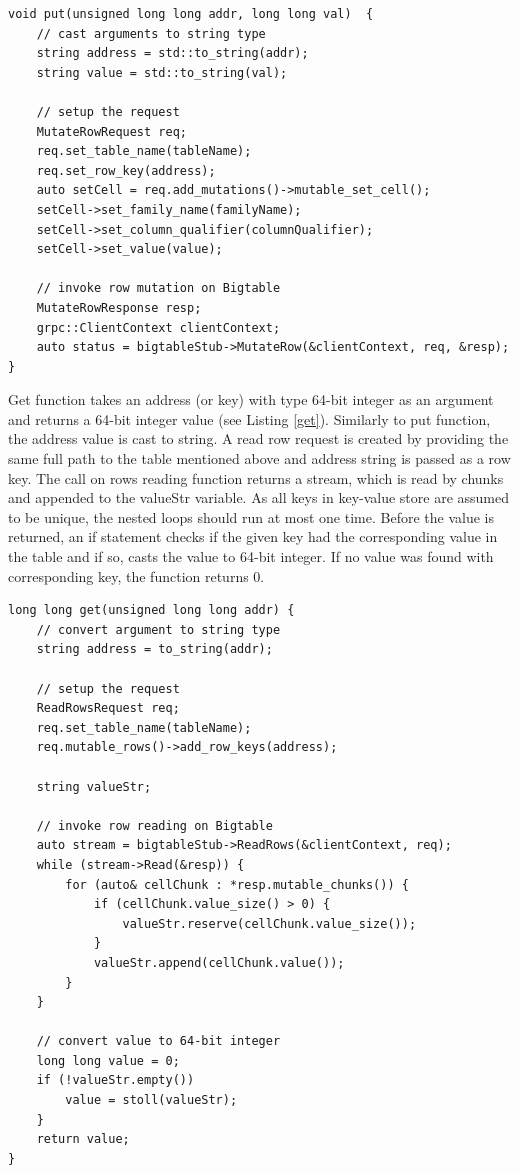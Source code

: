 \documentclass[bsc,frontabs,twoside,singlespacing,parskip,deptreport]{infthesis}     %
\begin{document}
\begin{lstlisting}[caption=Writing content to Bigtable using put() function, label=put, style=block]
void put(unsigned long long addr, long long val)  {
	// cast arguments to string type
	string address = std::to_string(addr);
	string value = std::to_string(val);

	// setup the request
	MutateRowRequest req;
	req.set_table_name(tableName);
	req.set_row_key(address);
	auto setCell = req.add_mutations()->mutable_set_cell();
	setCell->set_family_name(familyName);
	setCell->set_column_qualifier(columnQualifier);
	setCell->set_value(value);

	// invoke row mutation on Bigtable
	MutateRowResponse resp;
	grpc::ClientContext clientContext;
	auto status = bigtableStub->MutateRow(&clientContext, req, &resp);
}
\end{lstlisting}

Get function takes an address (or key) with type 64-bit integer as an argument and returns a 64-bit integer value (see Listing \ref{get}). Similarly to put function, the address value is cast to string. A read row request is created by providing the same full path to the table mentioned above and address string is passed as a row key. The call on rows reading function returns a stream, which is read by chunks and appended to the valueStr variable. As all keys in key-value store are assumed to be unique, the nested loops should run at most one time. Before the value is returned, an if statement checks if the given key had the corresponding value in the table and if so, casts the value to 64-bit integer. If no value was found with corresponding key, the function returns 0.

\begin{lstlisting}[caption=Reading content from Bigtable using get() function, label=get, style=block]
long long get(unsigned long long addr) {
	// convert argument to string type
	string address = to_string(addr);

	// setup the request
	ReadRowsRequest req;
	req.set_table_name(tableName);
	req.mutable_rows()->add_row_keys(address);
        
	string valueStr;
	
	// invoke row reading on Bigtable
	auto stream = bigtableStub->ReadRows(&clientContext, req);
	while (stream->Read(&resp)) {
		for (auto& cellChunk : *resp.mutable_chunks()) {
			if (cellChunk.value_size() > 0) {
				valueStr.reserve(cellChunk.value_size());
			}
			valueStr.append(cellChunk.value());
		}
	}
	
	// convert value to 64-bit integer
	long long value = 0;
	if (!valueStr.empty())
		value = stoll(valueStr);
	}
	return value;
}
\end{lstlisting}
\end{document}
